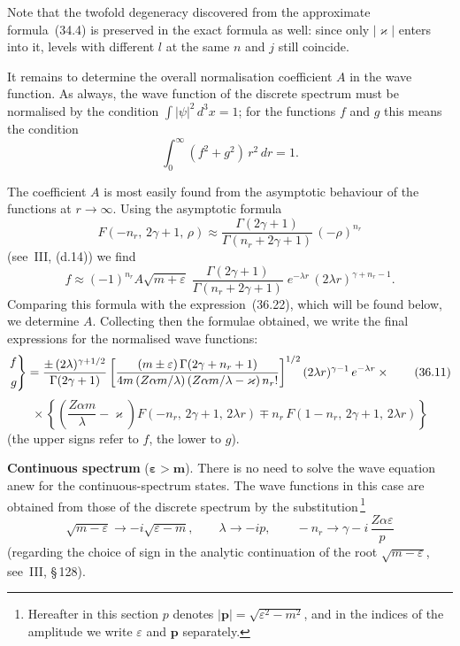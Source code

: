 Note that the twofold degeneracy discovered from the approximate formula~(34.4) is preserved in the exact formula as well: since only $|\varkappa|$ enters into it, levels with different $l$ at the same $n$ and $j$ still coincide.

It remains to determine the overall normalisation coefficient $A$ in the wave function. As always, the wave function of the discrete spectrum must be normalised by the condition $\int|\psi|^2\,d^3x = 1$; for the functions $f$ and $g$ this means the condition
\[
\int_0^\infty (f^2 + g^2)\,r^2\,dr = 1.
\]

The coefficient $A$ is most easily found from the asymptotic behaviour of the functions at $r\to\infty$. Using the asymptotic formula
\[
F(-n_r,\,2\gamma+1,\,\rho) \approx \frac{\Gamma(2\gamma+1)}{\Gamma(n_r + 2\gamma + 1)}\,(-\rho)^{n_r}
\]
(see~III, (d.14)) we find
\[
f \approx (-1)^{n_r} A\sqrt{m+\varepsilon}\;\frac{\Gamma(2\gamma+1)}{\Gamma(n_r + 2\gamma + 1)}\;e^{-\lambda r}\,(2\lambda r)^{\gamma + n_r - 1}.
\]
Comparing this formula with the expression~(36.22), which will be found below, we determine $A$. Collecting then the formulae obtained, we write the final expressions for the normalised wave functions:
\begin{equation}
\left.\begin{aligned}
f \\[2pt] g
\end{aligned}\right\}
= \frac{\pm\,(2\lambda)^{\gamma+\smash{1/2}}}{\Gamma(2\gamma+1)}
\left[\frac{(m\pm\varepsilon)\,\Gamma(2\gamma + n_r + 1)}{4m\,(Z\alpha m/\lambda)\,(Z\alpha m/\lambda - \varkappa)\,n_r!}\right]^{1/2}
(2\lambda r)^{\gamma-1}\,e^{-\lambda r}\times{}
\tag{36.11}
\end{equation}
\[
{}\times\left\{\left(\frac{Z\alpha m}{\lambda} - \varkappa\right)\!F(-n_r,\,2\gamma+1,\,2\lambda r) \mp n_r\,F(1-n_r,\,2\gamma+1,\,2\lambda r)\right\}
\]
(the upper signs refer to $f$, the lower to $g$).

\medskip
\textbf{Continuous spectrum} ($\boldsymbol{\varepsilon > m}$). There is no need to solve the wave equation anew for the continuous-spectrum states. The wave functions in this case are obtained from those of the discrete spectrum by the substitution\,\footnote{Hereafter in this section $p$ denotes $|\mathbf{p}| = \sqrt{\varepsilon^2 - m^2}$, and in the indices of the amplitude we write $\varepsilon$ and $\mathbf{p}$ separately.}
\begin{equation}
\sqrt{m - \varepsilon} \to -i\sqrt{\varepsilon - m},\qquad \lambda \to -ip,\qquad -n_r \to \gamma - i\,\frac{Z\alpha\varepsilon}{p}
\tag{36.12}
\end{equation}
(regarding the choice of sign in the analytic continuation of the root $\sqrt{m-\varepsilon}$, see~III, \S\,128).

